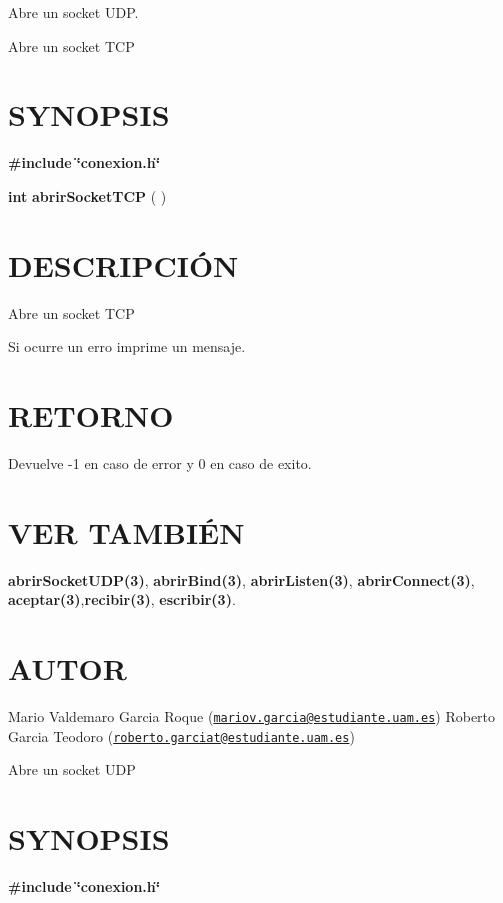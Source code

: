 Abre un socket U\-D\-P.

Abre un socket T\-C\-P\hypertarget{getTamanoFichero_SYNOPSIS}{}\section{S\-Y\-N\-O\-P\-S\-I\-S}\label{getTamanoFichero_SYNOPSIS}
{\bfseries \#include} {\bfseries \char`\"{}conexion.\-h\char`\"{}} 

{\bfseries int} {\bfseries abrir\-Socket\-T\-C\-P} {\bfseries }( )\hypertarget{getTamanoFichero_descripcion}{}\section{D\-E\-S\-C\-R\-I\-P\-C\-IÓ\-N}\label{getTamanoFichero_descripcion}
Abre un socket T\-C\-P

Si ocurre un erro imprime un mensaje.\hypertarget{getTamanoFichero_retorno}{}\section{R\-E\-T\-O\-R\-N\-O}\label{getTamanoFichero_retorno}
Devuelve -\/1 en caso de error y 0 en caso de exito.\hypertarget{servidorArchivo_seealso}{}\section{V\-E\-R T\-A\-M\-B\-IÉ\-N}\label{servidorArchivo_seealso}
{\bfseries abrir\-Socket\-U\-D\-P(3)}, {\bfseries abrir\-Bind(3)}, {\bfseries abrir\-Listen(3)}, {\bfseries abrir\-Connect(3)}, {\bfseries aceptar(3)},{\bfseries recibir(3)}, {\bfseries escribir(3)}.\hypertarget{getTamanoFichero_authors}{}\section{A\-U\-T\-O\-R}\label{getTamanoFichero_authors}
Mario Valdemaro Garcia Roque (\href{mailto:mariov.garcia@estudiante.uam.es}{\tt mariov.\-garcia@estudiante.\-uam.\-es}) Roberto Garcia Teodoro (\href{mailto:roberto.garciat@estudiante.uam.es}{\tt roberto.\-garciat@estudiante.\-uam.\-es})

Abre un socket U\-D\-P\hypertarget{getTamanoFichero_SYNOPSIS}{}\section{S\-Y\-N\-O\-P\-S\-I\-S}\label{getTamanoFichero_SYNOPSIS}
{\bfseries \#include} {\bfseries \char`\"{}conexion.\-h\char`\"{}} 

